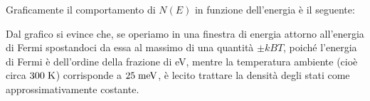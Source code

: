 Graficamente il comportamento di $N(E)$ in funzione dell'energia è il seguente:
\begin{figure}[H]
    \centering
\end{figure}
\hspace{-0.6cm}Dal grafico si evince che, se operiamo in una finestra di energia attorno all'energia di Fermi spostandoci da essa al massimo di una quantità $\pm kB T$, poiché l'energia di Fermi è dell'ordine della frazione di eV, mentre la temperatura ambiente (cioè circa $300 \; \rm K$) corrisponde a $25 \; \rm meV$, è lecito trattare la densità degli stati come approssimativamente costante.
